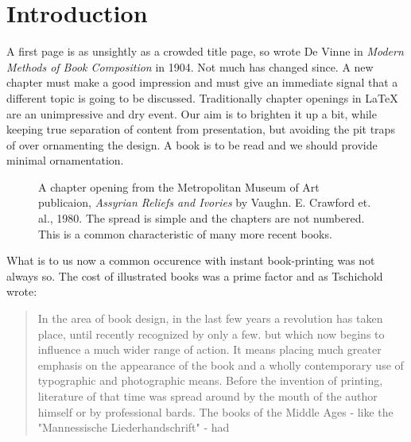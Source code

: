 \section*{Introduction}

A  first page is as unsightly as a crowded title page, so wrote De Vinne in \emph{Modern Methods of Book Composition} in 1904.  Not much has changed since. A new chapter must make a good impression and must give an immediate signal that a different topic is going to be discussed. Traditionally chapter openings in LaTeX are an unimpressive and dry event. Our aim is to brighten it up a bit, while keeping true separation of content from presentation, but avoiding the pit traps of over ornamenting the design. A book is to be read and we should provide minimal ornamentation. 

%

\begin{figure}[htbp]
\centering
\parindent=0pt
\par
\caption{A chapter opening from the Metropolitan Museum of Art publicaion, \textit{Assyrian Reliefs and Ivories} by Vaughn. E. Crawford et. al., 1980. The spread is simple and the chapters are not numbered. This is a common characteristic of many more recent books.}
\end{figure}


What is to us now a common occurence with instant book-printing was not always so. The cost of illustrated books was a prime factor and as Tschichold wrote:
\begin{quotation}
In the area of book design, in the last few years a revolution has taken place, until recently recognized by only a few. but which now begins to influence a much wider range of action.
It means placing much greater emphasis on the appearance of the book and a wholly contemporary use of typographic and photographic means. Before the invention of printing, literature of that time was spread around by the mouth of the author himself or by professional bards. The books of the Middle Ages - like the "Mannessische Liederhandschrift" - had
\end{quotation}

